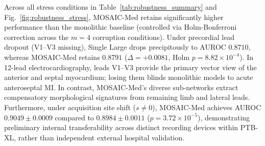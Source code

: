 \documentclass{ICIC2026}
\begin{document}
\begin{table}[t]
\caption{Robustness Stress Testing Across 5 Seeds}
\label{tab:robustness_summary}
\centering
\begin{ICICtable}
\end{ICICtable}
\end{table}

Across all stress conditions in Table~\ref{tab:robustness_summary} and Fig.~\ref{fig:robustness_stress}, MOSAIC-Med retains significantly higher performance than the monolithic baseline (controlled via Holm-Bonferroni correction across the $m=4$ corruption conditions). Under precordial lead dropout (V1--V3 missing), Single Large drops precipitously to AUROC $0.8710$, whereas MOSAIC-Med retains $0.8791$ ($\Delta = +0.0081$, Holm $p = 8.82 \times 10^{-4}$). In 12-lead electrocardiography, leads V1--V3 provide the primary vector view of the anterior and septal myocardium; losing them blinds monolithic models to acute anteroseptal MI. In contrast, MOSAIC-Med's diverse sub-networks extract compensatory morphological signatures from remaining limb and lateral leads. Furthermore, under acquisition site shift ($s \ne 0$), MOSAIC-Med achieves AUROC $0.9049 \pm 0.0009$ compared to $0.8984 \pm 0.0011$ ($p = 3.72 \times 10^{-5}$), demonstrating preliminary internal transferability across distinct recording devices within PTB-XL, rather than independent external hospital validation.
\end{document}

